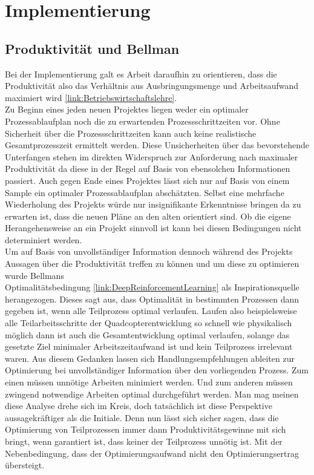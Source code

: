 \section{Implementierung}
\subsection{\label{Produktivität}Produktivität und Bellman}
Bei der Implementierung galt es Arbeit daraufhin zu orientieren, dass die Produktivität also das Verhältnis aus Ausbringungsmenge und Arbeitsaufwand maximiert wird \ref{link:Betriebswirtschaftslehre}.\\
Zu Beginn eines jeden neuen Projektes liegen weder ein optimaler Prozessablaufplan noch die zu erwartenden Prozessschrittzeiten vor. Ohne Sicherheit über die Prozessschrittzeiten kann auch keine realistische Gesamtprozesszeit ermittelt werden. Diese Unsicherheiten über das bevorstehende Unterfangen stehen im direkten Widerspruch zur Anforderung nach maximaler Produktivität da diese in der Regel auf Basis von ebensolchen Informationen passiert. Auch gegen Ende eines Projektes lässt sich nur auf Basis von einem Sample ein optimaler Prozessablaufplan abschätzten. Selbst eine mehrfache Wiederholung des Projekts würde nur insignifikante Erkenntnisse bringen da zu erwarten ist, dass die neuen Pläne an den alten orientiert sind. Ob die eigene Herangehensweise an ein Projekt sinnvoll ist kann bei diesen Bedingungen nicht determiniert werden.\\
Um auf Basis von unvollständiger Information dennoch während des Projekts Aussagen über die Produktivität treffen zu können und um diese zu optimieren wurde Bellmans\\ Optimalitätsbedingung \ref{link:DeepReinforcementLearning} als Inspirationsquelle herangezogen. Dieses sagt aus, dass Optimalität in bestimmten Prozessen dann gegeben ist, wenn alle Teilprozess optimal verlaufen. Laufen also beispielsweise alle Teilarbeitsschritte der Quadcopterentwicklung so schnell wie physikalisch möglich dann ist auch die Gesamtentwicklung optimal verlaufen, solange das gesetzte Ziel minimaler Arbeitszeitaufwand ist und kein Teilprozess irrelevant waren. Aus diesem Gedanken lassen sich Handlungsempfehlungen ableiten zur Optimierung bei unvollständiger Information über den vorliegenden Prozess. Zum einen müssen unnötige Arbeiten minimiert werden. Und zum anderen müssen zwingend notwendige Arbeiten optimal durchgeführt werden. Man mag meinen diese Analyse drehe sich im Kreis, doch tatsächlich ist diese Perspektive aussagekräftiger als die Initiale. Denn nun lässt sich sicher sagen, dass die Optimierung von Teilprozessen immer dann Produktivitätsgewinne mit sich bringt, wenn garantiert ist, dass keiner der Teilprozess unnötig ist. Mit der Nebenbedingung, dass der Optimierungsaufwand nicht den Optimierungsertrag übersteigt.\\
